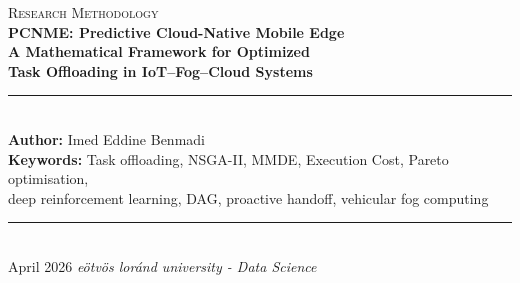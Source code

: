 \documentclass[12pt,a4paper]{article}
\theoremstyle{definition}
\theoremstyle{remark}
\begin{document}
\begin{titlepage}
\centering
\vspace*{2.5cm}
{\normalsize\textsc{Research Methodology}}\\[1.0cm]
{\LARGE\bfseries
  PCNME: Predictive Cloud-Native Mobile Edge\\[0.5em]
  A Mathematical Framework for Optimized\\[0.4em]
  Task Offloading in IoT--Fog--Cloud Systems
}\\[1.4cm]
\rule{0.55\linewidth}{0.5pt}\\[1.2cm]
{\normalsize
  \textbf{Author:} Imed Eddine Benmadi\\[0.5cm]
  \textbf{Keywords:} Task offloading, NSGA-II, MMDE,
  Execution Cost, Pareto optimisation,\\
  deep reinforcement learning, DAG,
  proactive handoff, vehicular fog computing
}\\[1.4cm]
\rule{0.55\linewidth}{0.5pt}\\[1.0cm]
{\normalsize April 2026}
\vfill
{\small\textit{eötvös loránd university - Data Science}}
\end{titlepage}

\begin{abstract}
\noindent
This paper presents the complete mathematical methodology of PCNME, the
Predictive Cloud-Native Mobile Edge framework for intelligent task offloading
in three-tier IoT--Fog--Cloud systems. The problem of routing computation-intensive
tasks from resource-constrained IoT vehicles to fog or cloud servers is formulated
as a multi-objective combinatorial optimization problem with deadline and capacity
constraints. We define all system variables and derive formal expressions for
\textit{\textbf{execution cost, task latency, and energy consumption}}. The methodology integrates
five algorithmic components: an Execution Cost classifier that pre-filters tasks
before optimization, an MMDE-enhanced NSGA-II multi-objective optimizer that
produces Pareto-optimal offline routing plans, a behavioral cloning pipeline
that seeds a Deep Q-Network agent from those plans, an online DQN agent that
adapts placement decisions to live network conditions, and a GPS-driven proactive
handoff predictor that prevents task failures when vehicles cross fog coverage
boundaries. Every variable, equation, and parameter is defined formally and its
physical interpretation is stated. The objective of this methodology section is
to provide a complete, self-contained mathematical foundation from which an
implementation can be derived without ambiguity.
\end{abstract}
\end{document}
